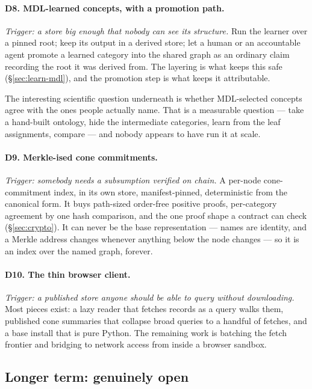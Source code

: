 \paragraph{D8. MDL-learned concepts, with a promotion path.}
\label{sec:dir-mdl}
\emph{Trigger: a store big enough that nobody can see its structure.} Run the
learner \citep{mdlfca} over a pinned root; keep its output in a derived store;
let a human or an accountable agent promote a learned category into the shared
graph as an ordinary claim recording the root it was derived from. The
layering is what keeps this safe (\S\ref{sec:learn-mdl}), and the promotion
step is what keeps it attributable.

The interesting scientific question underneath is whether MDL-selected
concepts agree with the ones people actually name. That is a measurable
question --- take a hand-built ontology, hide the intermediate categories,
learn from the leaf assignments, compare --- and nobody appears to have run
it at scale.

\paragraph{D9. Merkle-ised cone commitments.} \emph{Trigger: somebody needs a
subsumption verified on chain.} A per-node cone-commitment index, in its own
store, manifest-pinned, deterministic from the canonical form. It buys
path-sized order-free positive proofs, per-category agreement by one hash
comparison, and the one proof shape a contract can check
(\S\ref{sec:crypto}). It can never be the base representation --- names are
identity, and a Merkle address changes whenever anything below the node
changes --- so it is an index over the named graph, forever.

\paragraph{D10. The thin browser client.} \emph{Trigger: a published store
anyone should be able to query without downloading.} Most pieces exist: a
lazy reader that fetches records as a query walks them, published cone
summaries that collapse broad queries to a handful of fetches, and a base
install that is pure Python. The remaining work is batching the fetch frontier
and bridging to network access from inside a browser sandbox.

\subsection{Longer term: genuinely open}

